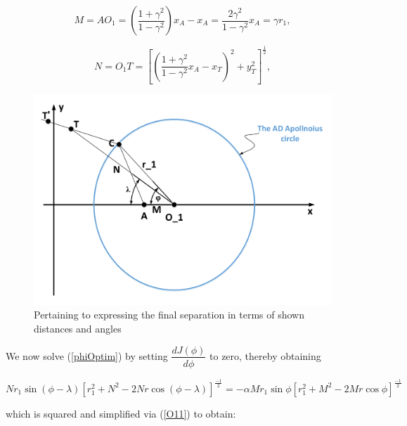 \begin{equation}
M= AO_1 = (\dfrac{1+\gamma^2}{1-\gamma^2})x_A - x_A 
=\dfrac{2\gamma^2}{1-\gamma^2} x_A = \gamma r_1,
\label{O11}
\end{equation}


\begin{equation}
N= O_1 T=[(\dfrac{1+\gamma^2}{1-\gamma^2}x_A - x_T)^2+y_T^2]^{\frac{1}{2}},
\label{N}
\end{equation}

\begin{figure}[H]
\centering
\includegraphics[scale = 0.5]{fig/drawing6_1.pdf}
\caption{Pertaining to expressing the final separation in terms of shown distances and angles}
\label{6.1}
\end{figure}


We now solve (\ref{phiOptim}) by setting $\dfrac{d J(\phi)}{d \phi}$ to zero, thereby obtaining 

\begin{equation}
N r_1 \sin(\phi - \lambda)[r_1^2+N^2-2Nr \cos(\phi-\lambda)]^{\frac{-1}{2}} =-\alpha M r_1 \sin\phi [r_1^2+M^2-2Mr \cos\phi]^{\frac{-1}{2}}
\label{6-12}
\end{equation}
 
which is squared and simplified via (\ref{O11}) to obtain:

